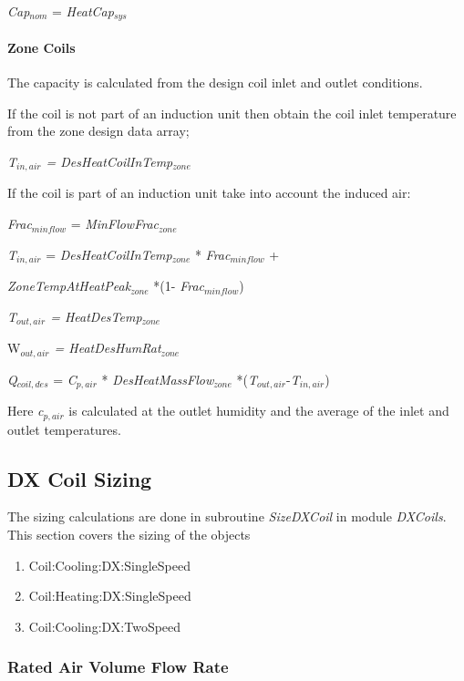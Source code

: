 \emph{Cap\(_{nom}\)} = \emph{HeatCap\(_{sys}\)}

\paragraph{Zone Coils}\label{zone-coils-3}

The capacity is calculated from the design coil inlet and outlet conditions.

If the coil is not part of an induction unit then obtain the coil inlet temperature from the zone design data array;

\emph{T\(_{in,air}\) = DesHeatCoilInTemp\(_{zone}\)}

If the coil is part of an induction unit take into account the induced air:

\emph{Frac\(_{minflow}\)} = \emph{MinFlowFrac\(_{zone}\)}

\emph{T\(_{in,air}\)} = \emph{DesHeatCoilInTemp\(_{zone}\)} * \emph{Frac\(_{minflow}\)} +

\emph{ZoneTempAtHeatPeak\(_{zone}\)} *(1- \emph{Frac\(_{minflow}\)})

\emph{T\(_{out,air}\) = HeatDesTemp\(_{zone}\)}

W\emph{\(_{out,air}\) = HeatDesHumRat\(_{zone}\)}

\emph{Q\(_{coil,des}\)} = \emph{C\(_{p,air}\)} * \emph{DesHeatMassFlow\(_{zone}\)} *(\emph{T\(_{out,air}\)}-\emph{T\(_{in,air}\)})

Here \emph{c\(_{p,air}\)} is calculated at the outlet humidity and the average of the inlet and outlet temperatures.

\subsection{DX Coil Sizing}\label{dx-coil-sizing}

The sizing calculations are done in subroutine \emph{SizeDXCoil} in module \emph{DXCoils}. This section covers the sizing of the objects

\begin{enumerate}
\def\labelenumi{\arabic{enumi}.}
\item
  Coil:Cooling:DX:SingleSpeed
\item
  Coil:Heating:DX:SingleSpeed
\item
  Coil:Cooling:DX:TwoSpeed
\end{enumerate}

\subsubsection{Rated Air Volume Flow Rate}\label{rated-air-volume-flow-rate}

